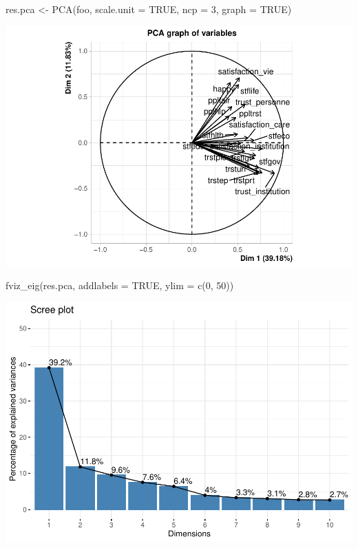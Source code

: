 \documentclass[
]{book}
\newenvironment{Shaded}{\begin{snugshade}}{\end{snugshade}}
\newcommand{\AttributeTok}[1]{\textcolor[rgb]{0.77,0.63,0.00}{#1}}
\newcommand{\ConstantTok}[1]{\textcolor[rgb]{0.00,0.00,0.00}{#1}}
\newcommand{\DecValTok}[1]{\textcolor[rgb]{0.00,0.00,0.81}{#1}}
\newcommand{\FunctionTok}[1]{\textcolor[rgb]{0.00,0.00,0.00}{#1}}
\newcommand{\NormalTok}[1]{#1}
\newcommand{\OtherTok}[1]{\textcolor[rgb]{0.56,0.35,0.01}{#1}}
\begin{document}
\begin{Shaded}
\begin{Highlighting}[]
\NormalTok{res.pca }\OtherTok{\textless{}{-}} \FunctionTok{PCA}\NormalTok{(foo, }\AttributeTok{scale.unit =} \ConstantTok{TRUE}\NormalTok{, }\AttributeTok{ncp =} \DecValTok{3}\NormalTok{, }\AttributeTok{graph =} \ConstantTok{TRUE}\NormalTok{)}
\end{Highlighting}
\end{Shaded}

\includegraphics{bookdown-demo_files/figure-latex/1103-2.pdf}

\begin{Shaded}
\begin{Highlighting}[]
\FunctionTok{fviz\_eig}\NormalTok{(res.pca, }\AttributeTok{addlabels =} \ConstantTok{TRUE}\NormalTok{, }\AttributeTok{ylim =} \FunctionTok{c}\NormalTok{(}\DecValTok{0}\NormalTok{, }\DecValTok{50}\NormalTok{))}
\end{Highlighting}
\end{Shaded}

\includegraphics{bookdown-demo_files/figure-latex/1103-3.pdf}
\end{document}
